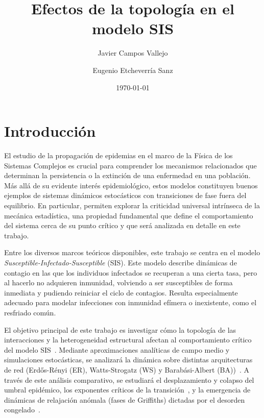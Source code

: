 \documentclass[%
reprint,
amsmath,amssymb,
aps,
]{revtex4-2}
\begin{document}
	
	\title{Efectos de la topología en el modelo SIS}
	
	\author{Javier Campos Vallejo}
	\author{Eugenio Etcheverría Sanz}
	
	\date{\today}
	
	\begin{abstract}
	\end{abstract}
	
	\maketitle
	
	\section{\label{sec:introduccion}Introducción}
	El estudio de la propagación de epidemias en el marco de la Física de los Sistemas Complejos es crucial para comprender los mecanismos relacionados que determinan la persistencia o la extinción de una enfermedad en una población. Más allá de su evidente interés epidemiológico, estos modelos constituyen buenos ejemplos de sistemas dinámicos estocásticos con transiciones de fase fuera del equilibrio. En particular, permiten explorar la criticidad universal intrínseca de la mecánica estadística, una propiedad fundamental que define el comportamiento del sistema cerca de su punto crítico y que será analizada en detalle en este trabajo.~\cite{PastorSatorras2015,Dorogovtsev2008,Albert2002,Odor2004}
	
	Entre los diversos marcos teóricos disponibles, este trabajo se centra en el modelo \textit{Susceptible-Infectado-Susceptible} (SIS). Este modelo describe dinámicas de contagio en las que los individuos infectados se recuperan a una cierta tasa, pero al hacerlo no adquieren inmunidad, volviendo a ser susceptibles de forma inmediata y pudiendo reiniciar el ciclo de contagios. Resulta especialmente adecuado para modelar infecciones con inmunidad efímera o inexistente, como el resfriado común.~\cite{PastorSatorras2015}
	
	
	El objetivo principal de este trabajo es investigar cómo la topología de las interacciones y la heterogeneidad estructural afectan al comportamiento crítico del modelo SIS~\cite{Roig2026}. Mediante aproximaciones analíticas de campo medio y simulaciones estocásticas, se analizará la dinámica sobre distintas arquitecturas de red (Erdős-Rényi (ER), Watts-Strogatz (WS) y  Barabási-Albert (BA))~\cite{Dorogovtsev2008, Albert2002}. A través de este análisis comparativo, se estudiará el desplazamiento y colapso del umbral epidémico, los exponentes críticos de la transición~\cite{Odor2004}, y la emergencia de dinámicas de relajación anómala (fases de Griffiths) dictadas por el desorden congelado~\cite{Muñoz2010,Noest1986}.
	
\end{document}
